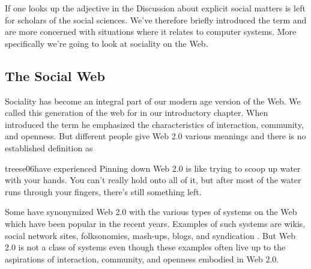 If one looks up the adjective  in the
Discussion about explicit social matters is left for scholars of the social
sciences. We've therefore briefly introduced the term and are more concerned
with situations where it relates to computer systems. More specifically
we're going to look at sociality on the Web.

\subsection{The Social Web}
\label{section:social.navigation.sociality.the.social.web}

Sociality has become an integral part of our modern age version of the Web.
We called this generation of the web for %
in our introductory chapter. When \citet{oreilly05} introduced the term he
emphasized the characteristics of interaction, community, and openness.
But different people give Web 2.0 various meanings and there is no
established definition as
\begin{fullquote}[\p{15}]{treese06}{have experienced}
  Pinning down Web 2.0 is like trying to scoop up water with your hands. You
  can't really hold onto all of it, but after most of the water runs through
  your fingers, there's still something left.
\end{fullquote}

Some have synonymized Web 2.0 with the various types of systems on the
Web which have been popular in the recent years. Examples of such systems
are wikis, social network sites, folksonomies, mash-ups, blogs, and
syndication .
But Web 2.0 is not a class of systems \citep[]{millard06} even though
these examples often live up to the aspirations of interaction, community,
and openness embodied in Web 2.0.

